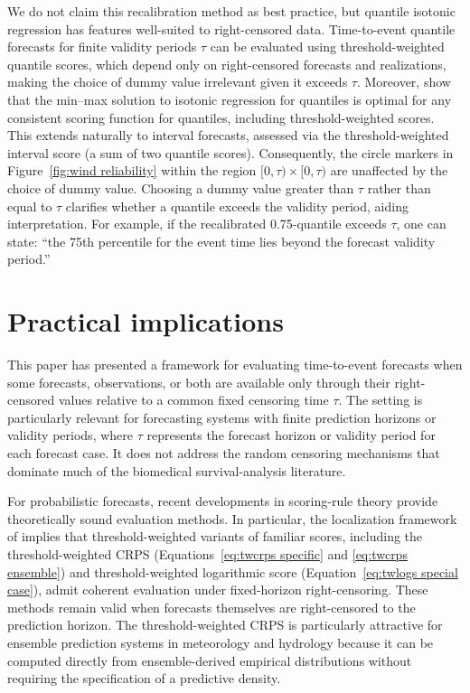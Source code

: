 \documentclass[10pt]{article} %
\theoremstyle{theorem}
\theoremstyle{definition}
\begin{document}
We do not claim this recalibration method as best practice, but quantile isotonic regression has features well-suited to right-censored data. Time-to-event quantile forecasts for finite validity periods $\tau$ can be evaluated using threshold-weighted quantile scores, which depend only on right-censored forecasts and realizations, making the choice of dummy value irrelevant given it exceeds $\tau$. Moreover, \citet{jordan2022characterizing} show that the min--max solution to isotonic regression for quantiles is optimal for any consistent scoring function for quantiles, including threshold-weighted scores. This extends naturally to interval forecasts, assessed via the threshold-weighted interval score (a sum of two quantile scores). Consequently, the circle markers in Figure~\ref{fig:wind reliability} within the region $[0,\tau)\times[0,\tau)$ are unaffected by the choice of  dummy value. Choosing a dummy value greater than $\tau$ rather than equal to $\tau$ clarifies whether a quantile exceeds the validity period, aiding interpretation. For example, if the recalibrated 0.75-quantile exceeds $\tau$, one can state: ``the 75th percentile for the event time lies beyond the forecast validity period.''


\section{Practical implications}\label{s:discussion}

This paper has presented a framework for evaluating time-to-event forecasts when some forecasts, observations, or both are available only through their right-censored values relative to a common fixed censoring time $\tau$. The setting is particularly relevant for forecasting systems with finite prediction horizons or validity periods, where $\tau$ represents the forecast horizon or validity period for each forecast case. It does not address the random censoring mechanisms that dominate much of the biomedical survival-analysis literature.

For probabilistic forecasts, recent developments in scoring-rule theory provide theoretically sound evaluation methods. In particular, the localization framework of \citet{de2025localizing} implies that threshold-weighted variants of familiar scores, including the threshold-weighted CRPS (Equations~\ref{eq:twcrps specific} and \ref{eq:twcrps ensemble}) and threshold-weighted logarithmic score (Equation~\ref{eq:twlogs special case}), admit coherent evaluation under fixed-horizon right-censoring. These methods remain valid when forecasts themselves are right-censored to the prediction horizon. The threshold-weighted CRPS is particularly attractive for ensemble prediction systems in meteorology and hydrology because it can be computed directly from ensemble-derived empirical distributions without requiring the specification of a predictive density.
\end{document}
